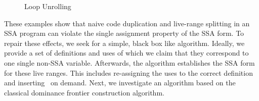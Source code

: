 \begin{figure}[htbp]
	\begin{center}
		\phantom{XXX}
		\phantom{XXX}
	\end{center}
	\caption{Loop Unrolling}
	\label{fig:unroll}
\end{figure}

These examples show that naive code duplication and live-range splitting in an SSA program can violate the single assignment property of the SSA form.
To repair these effects, we seek for a simple, black box like algorithm.
Ideally, we provide a set of definitions and uses of which we claim that they correspond to one single non-SSA variable.
Afterwards, the algorithm establishes the SSA form for these live ranges.
This includes re-assigning the uses to the correct definition and inserting \phiops\ on demand.
Next, we investigate an algorithm based on the classical dominance frontier construction algorithm.

